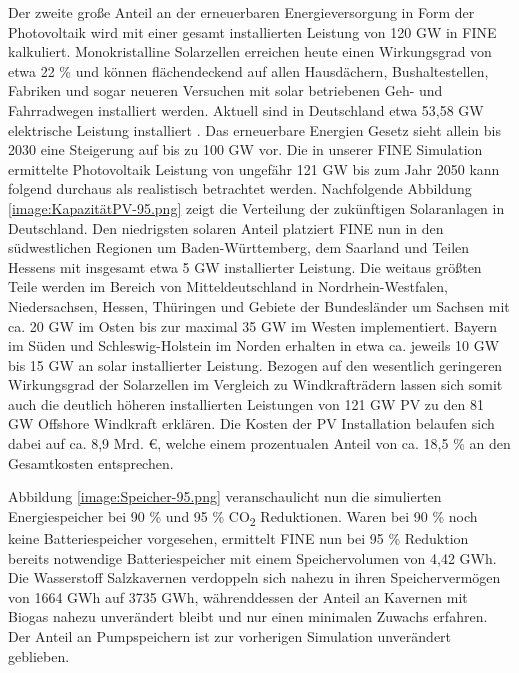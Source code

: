 Der zweite große Anteil an der erneuerbaren Energieversorgung in Form der Photovoltaik wird mit einer gesamt installierten Leistung von 120 GW in FINE kalkuliert. Monokristalline Solarzellen erreichen heute einen Wirkungsgrad von etwa 22 \% \cite{ag_2021} und können flächendeckend auf allen Hausdächern, Bushaltestellen, Fabriken und sogar neueren Versuchen mit solar betriebenen Geh- und Fahrradwegen installiert werden. Aktuell sind in Deutschland etwa 53,58 GW elektrische Leistung installiert \cite{ag_2021}. Das erneuerbare Energien Gesetz sieht allein bis 2030 eine Steigerung auf bis zu 100 GW vor.\cite{ag_2021} Die in unserer FINE Simulation ermittelte Photovoltaik Leistung von ungefähr 121 GW bis zum Jahr 2050 kann folgend durchaus als realistisch betrachtet werden. Nachfolgende Abbildung \ref{image:KapazitätPV-95.png} zeigt die Verteilung der zukünftigen Solaranlagen in Deutschland. Den niedrigsten solaren Anteil platziert FINE nun in den südwestlichen Regionen um Baden-Württemberg, dem Saarland und Teilen Hessens mit insgesamt etwa 5 GW installierter Leistung. Die weitaus größten Teile werden im Bereich von Mitteldeutschland in Nordrhein-Westfalen, Niedersachsen, Hessen, Thüringen und Gebiete der Bundesländer um Sachsen mit ca. 20 GW im Osten bis zur maximal 35 GW im Westen implementiert. Bayern im Süden und Schleswig-Holstein im Norden erhalten in etwa ca. jeweils 10 GW bis 15 GW an solar installierter Leistung. Bezogen auf den wesentlich geringeren Wirkungsgrad der Solarzellen im Vergleich zu Windkrafträdern lassen sich somit auch die deutlich höheren installierten Leistungen von 121 GW PV zu den 81 GW Offshore Windkraft erklären. Die Kosten der PV Installation belaufen sich dabei auf ca. 8,9 Mrd. €, welche einem prozentualen Anteil von ca. 18,5 \% an den Gesamtkosten entsprechen.



Abbildung \ref{image:Speicher-95.png} veranschaulicht nun die simulierten Energiespeicher bei 90 \% und 95 \% CO\textsubscript{2} Reduktionen. Waren bei 90 \% noch keine Batteriespeicher vorgesehen, ermittelt FINE nun bei 95 \% Reduktion bereits notwendige Batteriespeicher mit einem Speichervolumen von 4,42 GWh. Die Wasserstoff Salzkavernen verdoppeln sich nahezu in ihren Speichervermögen von 1664 GWh auf 3735 GWh, währenddessen der Anteil an Kavernen mit Biogas nahezu unverändert bleibt und nur einen minimalen Zuwachs erfahren. Der Anteil an Pumpspeichern ist zur vorherigen Simulation unverändert geblieben.


